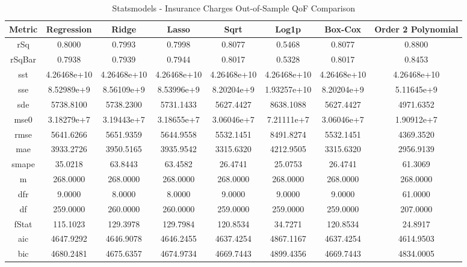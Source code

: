 \documentclass{article}
\begin{document}
\begin{table}[H]
\centering
\caption{Statsmodels - Insurance Charges Out-of-Sample QoF Comparison}
\label{tab:Statsmodels - Insurance Charges Out-of-Sample QoF Comparison}
\begin{tabular}{|c|c|c|c|c|c|c|c|}\hline
Metric & Regression & Ridge & Lasso & Sqrt & Log1p & Box-Cox & Order 2 Polynomial \\ \hline \hline
rSq & 0.8000 & 0.7993 & 0.7998 & 0.8077 & 0.5468 & 0.8077 & 0.8800 \\ \hline
rSqBar & 0.7938 & 0.7939 & 0.7944 & 0.8017 & 0.5328 & 0.8017 & 0.8453 \\ \hline
sst & 4.26468e+10 & 4.26468e+10 & 4.26468e+10 & 4.26468e+10 & 4.26468e+10 & 4.26468e+10 & 4.26468e+10 \\ \hline
sse & 8.52989e+9 & 8.56109e+9 & 8.53996e+9 & 8.20204e+9 & 1.93257e+10 & 8.20204e+9 & 5.11645e+9 \\ \hline
sde & 5738.8100 & 5738.2300 & 5731.1433 & 5627.4427 & 8638.1088 & 5627.4427 & 4971.6352 \\ \hline
mse0 & 3.18279e+7 & 3.19443e+7 & 3.18655e+7 & 3.06046e+7 & 7.21111e+7 & 3.06046e+7 & 1.90912e+7 \\ \hline
rmse & 5641.6266 & 5651.9359 & 5644.9558 & 5532.1451 & 8491.8274 & 5532.1451 & 4369.3520 \\ \hline
mae & 3933.2726 & 3950.5165 & 3935.9542 & 3315.6320 & 4212.9505 & 3315.6320 & 2956.9139 \\ \hline
smape & 35.0218 & 63.8443 & 63.4582 & 26.4741 & 25.0753 & 26.4741 & 61.3069 \\ \hline
m & 268.0000 & 268.0000 & 268.0000 & 268.0000 & 268.0000 & 268.0000 & 268.0000 \\ \hline
dfr & 9.0000 & 8.0000 & 8.0000 & 9.0000 & 9.0000 & 9.0000 & 61.0000 \\ \hline
df & 259.0000 & 260.0000 & 260.0000 & 259.0000 & 259.0000 & 259.0000 & 207.0000 \\ \hline
fStat & 115.1023 & 129.3978 & 129.7984 & 120.8534 & 34.7271 & 120.8534 & 24.8917 \\ \hline
aic & 4647.9292 & 4646.9078 & 4646.2455 & 4637.4254 & 4867.1167 & 4637.4254 & 4614.9503 \\ \hline
bic & 4680.2481 & 4675.6357 & 4674.9734 & 4669.7443 & 4899.4356 & 4669.7443 & 4834.0005 \\ \hline
\end{tabular}
\end{table}
\end{document}
